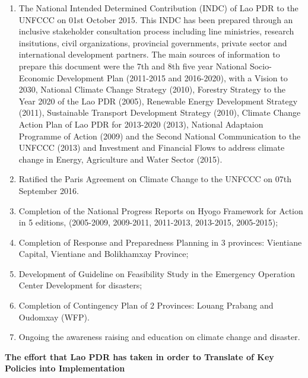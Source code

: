 \begin{enumerate}
\item The National Intended Determined Contribution (INDC) of Lao PDR to the UNFCCC on 01st October 2015. This INDC has been prepared through an inclusive stakeholder consultation process including line ministries, research insitutions, civil organizations, provincial governments, private sector and international development partners. The main sources of information to prepare this document were the 7th and 8th five year National Socio-Economic Development Plan (2011-2015 and 2016-2020), with a Vision to 2030, National Climate Change Strategy (2010), Forestry Strategy to the Year 2020 of the Lao PDR (2005), Renewable Energy Development Strategy (2011), Sustainable Transport Development Strategy (2010), Climate Change Action Plan of Lao PDR for 2013-2020 (2013), National Adaptaion Programme of Action (2009) and the Second National Communication to the UNFCCC (2013) and Investment and Financial Flows to address climate change in Energy, Agriculture and Water Sector (2015). 
\item Ratified the Paris Agreement on Climate Change to the UNFCCC on 07th September 2016.
\item Completion of the National Progress Reports on Hyogo Framework for Action in 5 editions, (2005-2009, 2009-2011, 2011-2013, 2013-2015, 2005-2015);
\item Completion of Response and Preparedness Planning in 3 provinces: Vientiane Capital, Vientiane and Bolikhamxay Province;
\item Development of Guideline on Feasibility Study in the Emergency Operation Center Development for disasters;
\item Completion of Contingency Plan of 2 Provinces: Louang Prabang and Oudomxay (WFP).
\item Ongoing the awareness raising and education on climate change and disaster.

\end{enumerate}

{\flushleft \large \bfseries The effort that Lao PDR has taken in order to Translate of Key Policies into Implementation}

